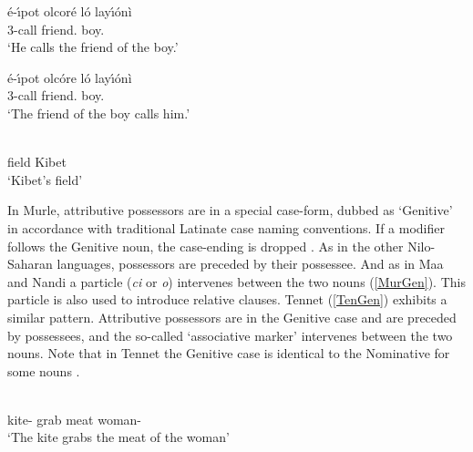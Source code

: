 \begin{exe}\ex\label{MaaGen}
\begin{xlist}
\ex\gll \'e-\'\i pot olcor\'e l\'o lay\'\i\'on\`i\\
3\sg{}-call friend.\acc{} \poss{} boy.\acc{}\\
\glt `He calls the friend of the boy.'

\ex\gll \'e-\'\i pot olc\'ore l\'o lay\'\i\'on\`i\\
3\sg{}-call friend.\nom{} \poss{} boy.\acc{}\\
\glt `The friend of the boy calls him.'
\end{xlist}
\end{exe}

\begin{exe}\ex\label{NanGen}
\gll {}  \\
field \poss{} Kibet\\
\glt `Kibet's field'
\end{exe}


In Murle, attributive possessors are in a special case-form, dubbed as `Genitive' in accordance with traditional Latinate case naming conventions. 
If a modifier follows the Genitive noun, the case-ending is dropped \citep[53--54]{Arensen:1982}. 
As in the other Nilo-Saharan languages, possessors are preceded by their possessee. 
And as in Maa and Nandi a particle (\emph{ci} or \emph{o}) intervenes between the two nouns (\ref{MurGen}).
This particle is also used to introduce relative clauses. 
Tennet (\ref{TenGen}) exhibits a similar pattern. 
Attributive possessors are in the Genitive case and are preceded by possessees, and the so-called `associative marker' intervenes between the two nouns. 
Note that in Tennet the Genitive case is identical to the Nominative  for some nouns \citep[225]{Randal:1998}. 

\begin{exe}
\ex\label{MurGen}
\gll{}    \\
kite-\nom{} grab meat \relativ{} woman-\gen{}\\
\glt `The kite grabs the meat of the woman' 
\end{exe}


